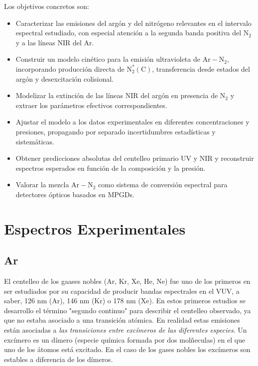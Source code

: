 \documentclass[12pt,a4paper]{article}
\newcommand{\N}{\mathrm{N}}
\newcommand{\Ar}{\mathrm{Ar}}
\begin{document}
Los objetivos concretos son:
\begin{itemize}
    \item Caracterizar las emisiones del argón y del nitrógeno relevantes en el intervalo espectral estudiado, con especial atención a la segunda banda positiva del N$_2$ y a las líneas NIR del Ar.
    \item Construir un modelo cinético para la emisión ultravioleta de $\Ar-\N_2$, incorporando producción directa de $\N_2^*(\mathrm{C})$, transferencia desde estados del argón y desexcitación colisional.
    \item Modelizar la extinción de las líneas NIR del argón en presencia de N$_2$ y extraer los parámetros efectivos correspondientes.
    \item Ajustar el modelo a los datos experimentales en diferentes concentraciones y presiones, propagando por separado incertidumbres estadísticas y sistemáticas.
    \item Obtener predicciones absolutas del centelleo primario UV y NIR y reconstruir espectros esperados en función de la composición y la presión.
    \item Valorar la mezcla $\Ar-\N_2$ como sistema de conversión espectral para detectores ópticos basados en MPGDs.
\end{itemize}

\section{Espectros Experimentales} \label{sec:experimental_espectra}

\subsection{Ar} \label{subsec:Ar_spectra}


El centelleo de los gaases nobles (Ar, Kr, Xe, He, Ne) fue uno de los primeros en ser estudiados por su capacidad de producir bandas espectrales en el VUV, a saber, 126 nm (Ar), 146 nm (Kr) o 178 nm (Xe). En estos primeros estudios se desarrollo el término "segundo continuo" para describir el centelleo observado, ya que no estaba asociado a una transición atómica. En realidad estas emisiones están asociadas a \textit{las transiciones entre excímeros de las diferentes especies}. Un excímero es un dímero (especie química formada por dos molñeculas) en el que uno de los átomos está excitado. En el caso de los gases nobles los excímeros son estables a diferencia de los dímeros. 
\end{document}
